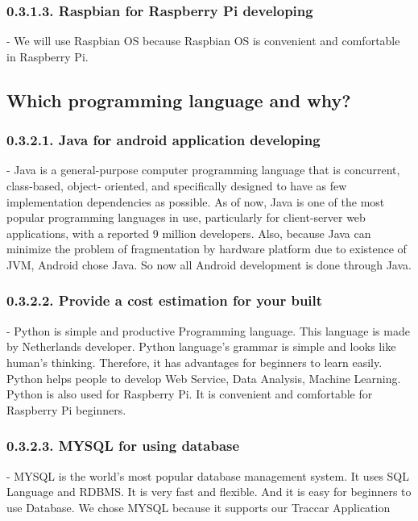 \documentclass[10pt,a4paper,twocolumn]{report}
\begin{document}
		\subsubsection{0.3.1.3. Raspbian for Raspberry Pi developing}
		- We will use Raspbian OS because Raspbian OS is convenient and comfortable in Raspberry Pi. \\
		
	\subsection{Which programming language and why?}	
		\subsubsection{0.3.2.1. Java for android application developing}
		- Java is a general-purpose computer programming language that is concurrent, class-based, object- oriented, and specifically designed to have as few implementation dependencies as possible. As of now, Java is one of the most popular programming languages in use, particularly for client-server web applications, with a reported 9 million developers. Also, because Java can minimize the problem of fragmentation by hardware platform due to existence of JVM, Android chose Java. So now all Android development is done through Java.\\
		
		\subsubsection{0.3.2.2. Provide a cost estimation for your built}	
		- Python is simple and productive Programming language. This language is made by Netherlands developer. Python language’s grammar is simple and looks like human’s thinking. Therefore, it has advantages for beginners to learn easily. Python helps people to develop Web Service, Data Analysis, Machine Learning. Python is also used for Raspberry Pi. It is convenient and comfortable for Raspberry Pi beginners. \\
	
		\subsubsection{0.3.2.3. MYSQL for using database}
		- MYSQL is the world’s most popular database management system. It uses SQL Language and RDBMS. It is very fast and flexible. And it is easy for beginners to use Database. We chose MYSQL because it supports our Traccar Application\\
		
\end{document}
